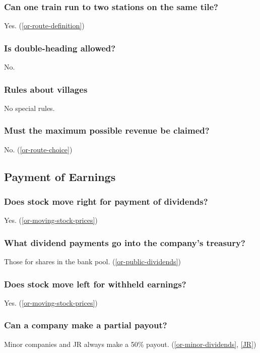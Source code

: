 \subsubsection{Can one train run to two stations on the same tile?}
Yes. (\autoref{or-route-definition})

\subsubsection{Is double-heading allowed?}
No.

\subsubsection{Rules about villages}
No special rules.

\subsubsection{Must the maximum possible revenue be claimed?}
No. (\autoref{or-route-choice})

\subsection{Payment of Earnings}

\subsubsection{Does stock move right for payment of dividends?}
Yes. (\autoref{or-moving-stock-prices})

\subsubsection{What dividend payments go into the company's treasury?}
Those for shares in the bank pool. (\autoref{or-public-dividends})

\subsubsection{Does stock move left for withheld earnings?}
Yes. (\autoref{or-moving-stock-prices})

\subsubsection{Can a company make a partial payout?}
Minor companies and JR always make a 50\%
payout. (\autoref{or-minor-dividends}, \autoref{JR})

